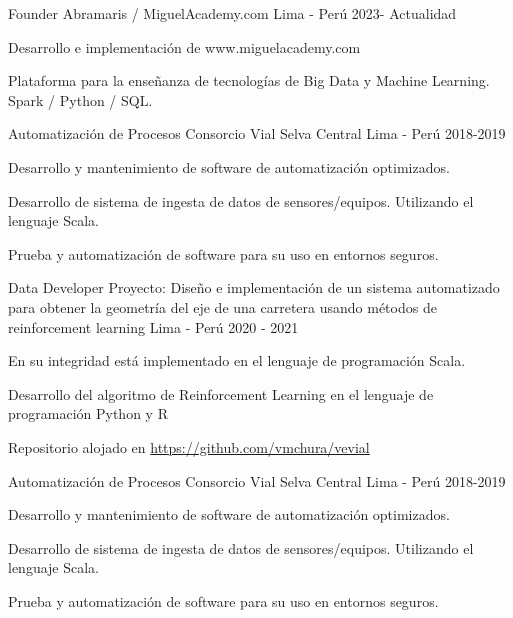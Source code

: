 \begin{cventries}
  \cventry
  {Founder} %
  {Abramaris / MiguelAcademy.com} %
  {Lima - Per\'u} %
  {2023- Actualidad} %
  {
    \begin{cvitems} %
      \item {Desarrollo e implementaci\'on de www.miguelacademy.com}
      \item {Plataforma para la enseñanza de tecnolog\'ias de Big Data y Machine Learning. Spark / Python / SQL.}
    \end{cvitems}
  }
  \cventry
  {Automatizaci\'on de Procesos} %
  {Consorcio Vial Selva Central} %
  {Lima - Per\'u} %
  {2018-2019} %
  {
    \begin{cvitems} %
      \item {Desarrollo y mantenimiento de software de automatizaci\'on optimizados.}
      \item {Desarrollo de sistema de ingesta de datos de sensores/equipos. Utilizando el lenguaje Scala.}
      \item {Prueba y automatizaci\'on de software para su uso en entornos seguros.}
    \end{cvitems}
  }
  \cventry
  {Data Developer} %
  {Proyecto: Diseño e implementación de un sistema automatizado para obtener la geometría del eje de una carretera usando métodos de reinforcement learning} %
  {Lima - Per\'u} %
  {2020 - 2021} %
  {
    \begin{cvitems} %
      \item {En su integridad está implementado en el lenguaje de programación Scala.}
      \item {Desarrollo del algoritmo de Reinforcement Learning en el lenguaje de programación Python y R}
      \item {Repositorio alojado en \href{https://github.com/vmchura/vevial}{https://github.com/vmchura/vevial}}
    \end{cvitems}
  }
  \cventry
  {Automatizaci\'on de Procesos} %
  {Consorcio Vial Selva Central} %
  {Lima - Per\'u} %
  {2018-2019} %
  {
    \begin{cvitems} %
      \item {Desarrollo y mantenimiento de software de automatizaci\'on optimizados.}
      \item {Desarrollo de sistema de ingesta de datos de sensores/equipos. Utilizando el lenguaje Scala.}
      \item {Prueba y automatizaci\'on de software para su uso en entornos seguros.}
    \end{cvitems}
  }


\end{cventries}
